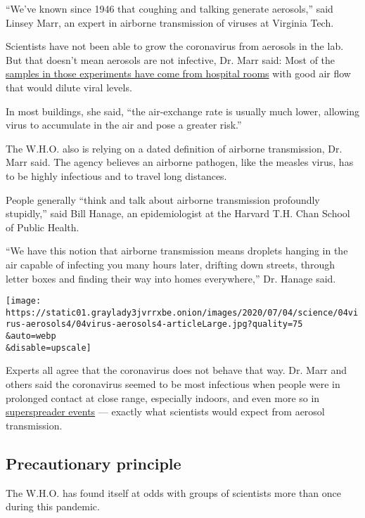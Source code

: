 ``We've known since 1946 that coughing and talking generate aerosols,''
said Linsey Marr, an expert in airborne transmission of viruses at
Virginia Tech.

Scientists have not been able to grow the coronavirus from aerosols in
the lab. But that doesn't mean aerosols are not infective, Dr. Marr
said: Most of the
\href{https://www.sciencedirect.com/science/article/pii/S0013935120307143?via\%3Dihub}{samples
in those experiments have come from hospital rooms} with good air flow
that would dilute viral levels.

In most buildings, she said, ``the air-exchange rate is usually much
lower, allowing virus to accumulate in the air and pose a greater
risk.''

The W.H.O. also is relying on a dated definition of airborne
transmission, Dr. Marr said. The agency believes an airborne pathogen,
like the measles virus, has to be highly infectious and to travel long
distances.

People generally ``think and talk about airborne transmission profoundly
stupidly,'' said Bill Hanage, an epidemiologist at the Harvard T.H. Chan
School of Public Health.

``We have this notion that airborne transmission means droplets hanging
in the air capable of infecting you many hours later, drifting down
streets, through letter boxes and finding their way into homes
everywhere,'' Dr. Hanage said.

\texttt{[image: https://static01.graylady3jvrrxbe.onion/images/2020/07/04/science/04virus-aerosols4/04virus-aerosols4-articleLarge.jpg?quality=75\\\&auto=webp\\\&disable=upscale]}

Experts all agree that the coronavirus does not behave that way. Dr.
Marr and others said the coronavirus seemed to be most infectious when
people were in prolonged contact at close range, especially indoors, and
even more so in
\href{https://www.nytimes3xbfgragh.onion/2020/06/30/science/how-coronavirus-spreads.html}{superspreader
events} --- exactly what scientists would expect from aerosol
transmission.

\hypertarget{precautionary-principle}{%
\subsection{Precautionary principle}\label{precautionary-principle}}

The W.H.O. has found itself at odds with groups of scientists more than
once during this pandemic.


